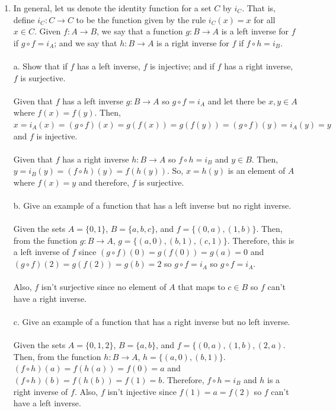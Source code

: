 \documentclass[]{article}
\begin{document}
\begin{enumerate}
    \item In general, let us denote the identity function for a set $C$ by $i_C$. That is, define $i_C: C \rightarrow C$ to be the function given by the rule $i_C(x)=x$ for all $x \in C$. Given $f: A \rightarrow B$, we say that a function $g: B \rightarrow A$ is a left inverse for $f$ if $g \circ f = i_A$; and we say that $h:B \rightarrow A$ is a right inverse for $f$ if $f \circ h = i_B$.
    \\\\a. Show that if $f$ has a left inverse, $f$ is injective; and if $f$ has a right inverse, $f$ is surjective.
    \\\\ Given that $f$ has a left inverse $g: B \rightarrow A$ so $g \circ f = i_A$ and let there be $x,y \in A$ where $f(x)=f(y)$. Then, $x = i_A(x) = (g \circ f)(x) = g(f(x)) = g(f(y)) = (g \circ f)(y) = i_A(y) = y$ and $f$ is injective.
    \\\\ Given that $f$ has a right inverse $h: B \rightarrow A$ so $f \circ h = i_B$ and $y \in B$. Then, $y = i_B(y) = (f \circ h)(y) = f(h(y))$. So, $x=h(y)$ is an element of $A$ where $f(x)=y$ and therefore, $f$ is surjective.
    \\\\b. Give an example of a function that has a left inverse but no right inverse.
    \\\\ Given the sets $A = \{0,1\}$, $B = \{a,b,c\}$, and $f = \{(0,a),(1,b)\}$. Then, from the function $g: B \rightarrow A$, $g = \{(a,0),(b,1),(c,1)\}$. Therefore, this is a left inverse of $f$ since $(g \circ f)(0)=g(f(0))=g(a)=0$ and $(g \circ f)(2)=g(f(2))=g(b)=2$ so $g \circ f=i_A$ so $g \circ f=i_A$.
    \\\\ Also, $f$ isn't surjective since no element of $A$ that maps to $c \in B$ so $f$ can't have a right inverse.
    \\\\c. Give an example of a function that has a right inverse but no left inverse.
    \\\\ Given the sets $A = \{0,1,2\}$, $B = \{a,b\}$, and $f = \{(0,a),(1,b),(2,a)$. Then, from the function $h: B \rightarrow A$, $h = \{(a,0),(b,1)\}$. $(f \circ h)(a) = f(h(a)) = f(0) = a$ and $(f \circ h)(b) = f(h(b)) = f(1) = b$. Therefore, $f \circ h = i_B$ and $h$ is a right inverse of $f$. Also, $f$ isn't injective since $f(1) = a = f(2)$ so $f$ can't have a left inverse. 

\end{enumerate}
\end{document}
